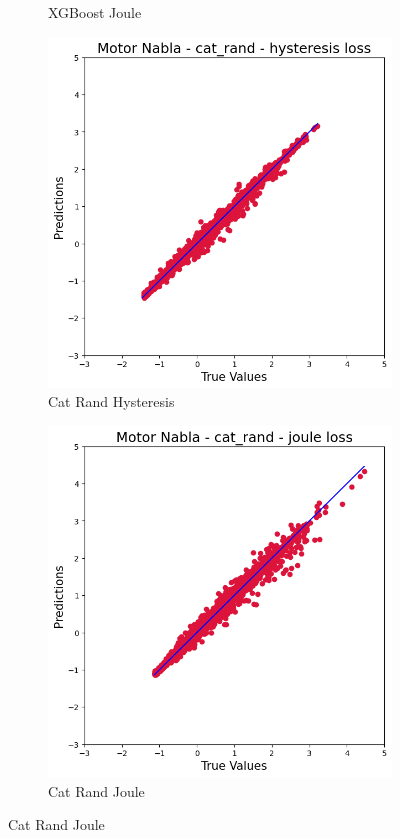 \documentclass{article}
\begin{document}
\begin{figure}[!htbp]
\begin{subfigure}[b]{0.23\textwidth}
        \caption{XGBoost Joule}
    \end{subfigure}
    \hfill
    \begin{subfigure}[b]{0.23\textwidth}
        \centering
        \includegraphics[width=\textwidth]{images/Nabla/cat_rand_hysteresis.png}
        \caption{Cat Rand Hysteresis}
    \end{subfigure}
    \hfill
    \begin{subfigure}[b]{0.23\textwidth}
        \centering
        \includegraphics[width=\textwidth]{images/Nabla/cat_rand_joule.png}
        \caption{Cat Rand Joule}
    \end{subfigure}
    

\end{figure}
\end{document}
